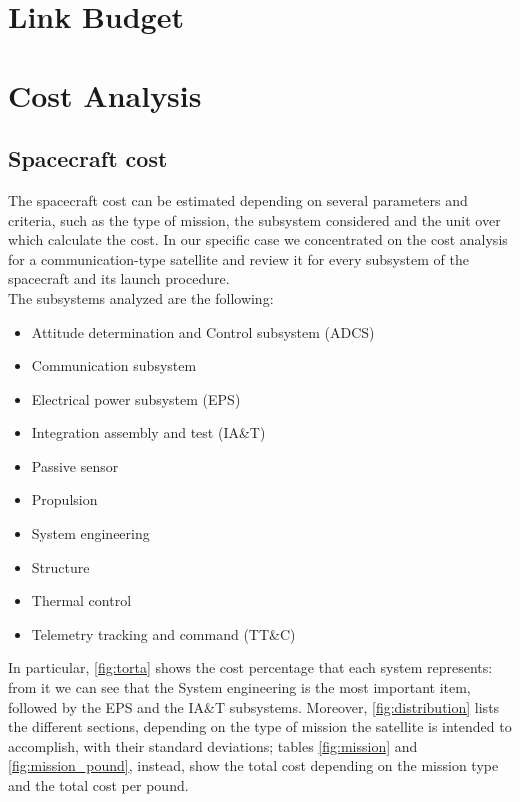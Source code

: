 \documentclass[11pt,a4paper,titlepage]{article}
\begin{document}
\section{Link Budget}
\lipsum[1]

\section{Cost Analysis}
	\subsection{Spacecraft cost}
		The spacecraft cost can be estimated depending on several parameters and criteria, such as the type of mission, the 				subsystem considered and the unit over which calculate the cost. In our specific case we concentrated on the cost analysis 		for a communication-type satellite and review it for every subsystem of the spacecraft and its launch procedure.\\
		
		The subsystems analyzed  are the following:
		\begin{itemize}
			\item Attitude determination and Control subsystem (ADCS)
			\item Communication subsystem
			\item Electrical power subsystem (EPS)
			\item Integration assembly and test (IA\&T)
			\item Passive sensor
			\item Propulsion
			\item System engineering
			\item Structure
			\item Thermal control
			\item Telemetry tracking and command (TT\&C)
		\end{itemize}
		In particular, \autoref{fig:torta} shows the cost percentage that each system represents: from it we can see that the 				System engineering is the most important item, followed by the EPS and the IA\&T subsystems. Moreover, 						\autoref{fig:distribution} lists the different sections, depending on the type of mission the satellite is intended to 					accomplish, with their standard deviations; tables \ref{fig:mission} and \ref{fig:mission_pound}, instead, show the total 			cost depending on the mission type and the total cost per pound.
		
\end{document}
